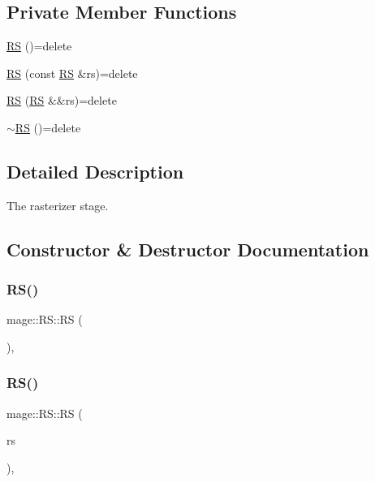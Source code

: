 \subsection*{Private Member Functions}
\begin{DoxyCompactItemize}
\item 
\hyperlink{structmage_1_1_r_s_a1fc82b526daf7b01a127ff230de4dc0f}{RS} ()=delete
\item 
\hyperlink{structmage_1_1_r_s_aa11ce64e931ecc362e16e11d9ba73033}{RS} (const \hyperlink{structmage_1_1_r_s}{RS} \&rs)=delete
\item 
\hyperlink{structmage_1_1_r_s_af44bf6efac1ce52be0faa8ec74f67b7d}{RS} (\hyperlink{structmage_1_1_r_s}{RS} \&\&rs)=delete
\item 
\hyperlink{structmage_1_1_r_s_adfd53eeb50a43afc68c8f1a6cf2f7eab}{$\sim$\+RS} ()=delete
\end{DoxyCompactItemize}


\subsection{Detailed Description}
The rasterizer stage. 

\subsection{Constructor \& Destructor Documentation}
\hypertarget{structmage_1_1_r_s_a1fc82b526daf7b01a127ff230de4dc0f}{}\label{structmage_1_1_r_s_a1fc82b526daf7b01a127ff230de4dc0f} 
\subsubsection{\texorpdfstring{R\+S()}{RS()}\hspace{0.1cm}{\footnotesize\ttfamily [1/3]}}
{\footnotesize\ttfamily mage\+::\+R\+S\+::\+RS (\begin{DoxyParamCaption}{ }\end{DoxyParamCaption})\hspace{0.3cm}{\ttfamily [private]}, {\ttfamily [delete]}}

\hypertarget{structmage_1_1_r_s_aa11ce64e931ecc362e16e11d9ba73033}{}\label{structmage_1_1_r_s_aa11ce64e931ecc362e16e11d9ba73033} 
\subsubsection{\texorpdfstring{R\+S()}{RS()}\hspace{0.1cm}{\footnotesize\ttfamily [2/3]}}
{\footnotesize\ttfamily mage\+::\+R\+S\+::\+RS (\begin{DoxyParamCaption}\item[{const \hyperlink{structmage_1_1_r_s}{RS} \&}]{rs }\end{DoxyParamCaption})\hspace{0.3cm}{\ttfamily [private]}, {\ttfamily [delete]}}

